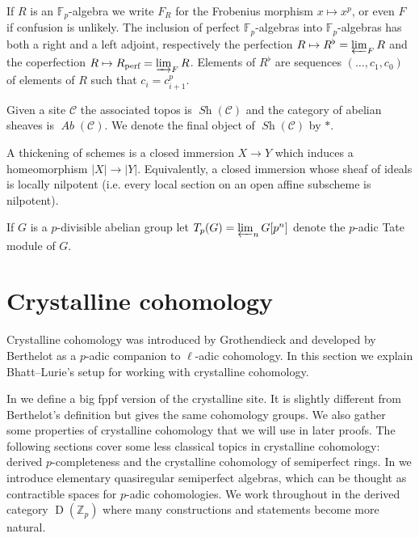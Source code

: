 \documentclass[11pt]{article}
\theoremstyle{plain}
\theoremstyle{definition}
\theoremstyle{remark}
\numberwithin{equation}{section}
\renewcommand{\sec}[2]{\section{#2}\label{S:#1}}
\newcommand\calC{\mathcal{C}}
\newcommand{\Fp}{\mathbb{F}_p}
\newcommand{\Zp}{\mathbb{Z}_p}
\DeclareMathOperator{\D}{D}                                              %
\DeclareMathOperator{\Ab}{\textit{Ab}}                                   %
\DeclareMathOperator{\Top}{\textit{Sh}}                                  %
\newcommand\perf[1]{#1^{\flat}}                                          %
\newcommand\coperf[1]{#1_{\textnormal{perf}}}                            %
\begin{document}
If $R$ is an $\Fp$-algebra we write $F_R$ for the Frobenius morphism $x\mapsto x^p$, or even $F$ if confusion is unlikely. The inclusion of perfect $\Fp$-algebras into $\Fp$-algebras has both a right and a left adjoint, respectively the perfection $R \mapsto \perf{R}=\varprojlim_{F}R$ and the coperfection $R \mapsto \coperf{R}=\varinjlim_{F}R$. Elements of $\perf{R}$ are sequences $(\dotsc,c_1,c_0)$ of elements of $R$ such that $c_i=c_{i+1}^p$. 

Given a site $\calC$ the associated topos is $\Top(\calC)$ and the category of abelian sheaves is $\Ab(\calC)$. We denote the final object of $\Top(\calC)$ by $*$.

A thickening of schemes is a closed immersion $X\to Y$ which induces a homeomorphism $|X|\to |Y|$. Equivalently, a closed immersion whose sheaf of ideals is locally nilpotent (i.e. every local section on an open affine subscheme is nilpotent).

If $G$ is a $p$-divisible abelian group let $T_p(G)=\varprojlim_n G[p^n]$ denote the $p$-adic Tate module of $G$.






\sec{prel}{Crystalline cohomology}



Crystalline cohomology was introduced by Grothendieck \cite{grothendieckinf} and developed by Berthelot \cite{berthelotcris} as a $p$-adic companion to $\ell$-adic cohomology. In this section we explain Bhatt--Lurie's setup for working with crystalline cohomology. 

In  we define a big fppf version of the crystalline site. It is slightly different from Berthelot's definition but gives the same cohomology groups. We also gather some properties of crystalline cohomology that we will use in later proofs. The following sections cover some less classical topics in crystalline cohomology: derived $p$-completeness and the crystalline cohomology of semiperfect rings. In  we introduce elementary quasiregular semiperfect algebras, which can be thought as contractible spaces for $p$-adic cohomologies. We work throughout in the derived category $\D(\Zp)$ where many constructions and statements become more natural.
\end{document}
